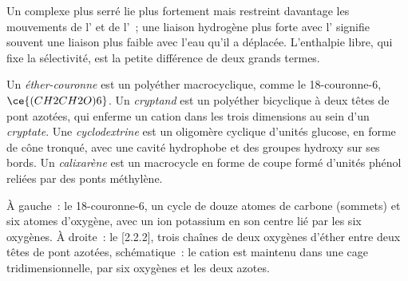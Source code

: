 Un complexe plus serré lie plus fortement mais restreint davantage les
mouvements de l' et de l'~; une liaison hydrogène plus forte avec
l' signifie souvent une liaison plus faible avec l'eau qu'il a
déplacée. L'enthalpie libre, qui fixe la sélectivité, est la petite
différence de deux grands termes.

\begin{definition}[Hôtes]\label{def:b3:supramolecular:hosts}
Un \emph{éther-couronne} est un polyéther macrocyclique, comme le
18-couronne-6, $\ce{(CH2CH2O)6}$. Un \emph{cryptand} est un polyéther
bicyclique à deux têtes de pont azotées, qui enferme un cation dans les
trois dimensions au sein d'un \emph{cryptate}. Une
\emph{cyclodextrine} est un oligomère cyclique
d'unités glucose, en forme de cône tronqué, avec une cavité hydrophobe et
des groupes hydroxy sur ses bords. Un \emph{calixarène} est un
macrocycle en forme de coupe formé d'unités phénol reliées par des ponts
méthylène.
\end{definition}

\begin{omfigure}

{\small À gauche~: le 18-couronne-6, un cycle de douze atomes de carbone
(sommets) et six atomes d'oxygène, avec un ion potassium en son centre lié
par les six oxygènes. À droite~: le [2.2.2], trois chaînes de deux
oxygènes d'éther entre deux têtes de pont azotées, schématique~: le cation
est maintenu dans une cage tridimensionnelle, par six oxygènes et les deux
azotes.}
\end{omfigure}

